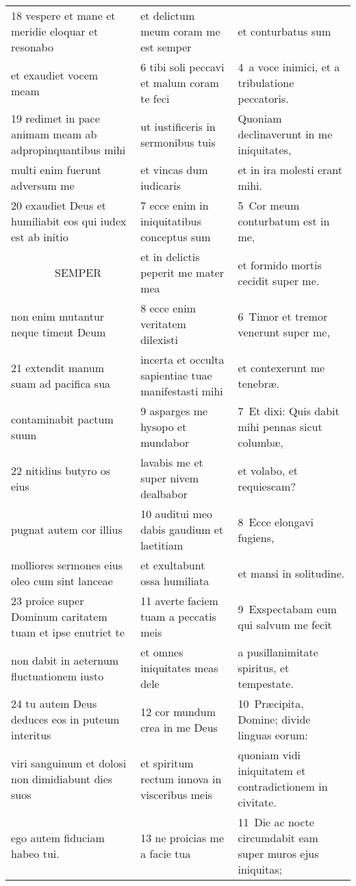 \documentclass{article}
\begin{document}
\begin{longtable}{@{}p{}p{}p{}@{}}
18 vespere et mane et meridie eloquar et resonabo	&	et delictum meum coram me est semper	&	et conturbatus sum	\\
et exaudiet vocem meam	&	6 tibi soli peccavi et malum coram te feci	&	4 a voce inimici, et a tribulatione peccatoris.	\\
19 redimet in pace animam meam ab adpropinquantibus mihi	&	ut iustificeris in sermonibus tuis	&	Quoniam declinaverunt in me iniquitates,	\\
multi enim fuerunt adversum me	&	et vincas dum iudicaris	&	et in ira molesti erant mihi.	\\
20 exaudiet Deus et humiliabit eos qui iudex est ab initio	&	7 ecce enim in iniquitatibus conceptus sum	&	5 Cor meum conturbatum est in me,	\\
    SEMPER	&	et in delictis peperit me mater mea	&	et formido mortis cecidit super me.	\\
non enim mutantur neque timent Deum	&	8 ecce enim veritatem dilexisti	&	6 Timor et tremor venerunt super me,	\\
21 extendit manum suam ad pacifica sua	&	incerta et occulta sapientiae tuae manifestasti mihi	&	et contexerunt me tenebræ.	\\
contaminabit pactum suum	&	9 asparges me hysopo et mundabor	&	7 Et dixi: Quis dabit mihi pennas sicut columbæ,	\\
22 nitidius butyro os eius	&	lavabis me et super nivem dealbabor	&	et volabo, et requiescam?	\\
pugnat autem cor illius	&	10 auditui meo dabis gaudium et laetitiam	&	8 Ecce elongavi fugiens,	\\
molliores sermones eius oleo cum sint lanceae	&	et exultabunt ossa humiliata	&	et mansi in solitudine.	\\
23 proice super Dominum caritatem tuam et ipse enutriet te	&	11 averte faciem tuam a peccatis meis	&	9 Exspectabam eum qui salvum me fecit	\\
non dabit in aeternum fluctuationem iusto	&	et omnes iniquitates meas dele	&	a pusillanimitate spiritus, et tempestate.	\\
24 tu autem Deus deduces eos in puteum interitus	&	12 cor mundum crea in me Deus	&	10 Præcipita, Domine; divide linguas eorum:	\\
viri sanguinum et dolosi non dimidiabunt dies suos	&	et spiritum rectum innova in visceribus meis	&	quoniam vidi iniquitatem et contradictionem in civitate.	\\
ego autem fiduciam habeo tui.	&	13 ne proicias me a facie tua	&	11 Die ac nocte circumdabit eam super muros ejus iniquitas;	\\

\end{longtable}
\end{document}
